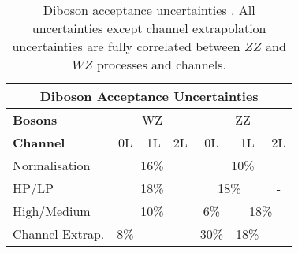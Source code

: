 \begin{table}[!htbp] 
    \footnotesize\centering
    \setlength{\tabcolsep}{0.5em} %
    \begin{tabular}{l|c|c|c|c|c|c}
    \toprule\hline
    \multicolumn{7}{c}{Diboson Acceptance Uncertainties}            
    \\ \hline
    \textbf{Bosons}     & \multicolumn{3}{c|}{{WZ}} & \multicolumn{3}{c}{{ZZ}} 
    \\ \hline
    \textbf{Channel}    &   0L      &   1L    &   2L    &   0L      &   1L      & 2L          
    \\ \hline
    Normalisation       &  \multicolumn{3}{c|}{{16\%}}    &  \multicolumn{3}{c}{{10\%}}
    \\ \hline
    HP/LP               &   \multicolumn{3}{c|}{{18\%}}   &   \multicolumn{2}{c|}{{18\%}}    &   -      
    \\ \hline
    High/Medium    &    \multicolumn{3}{c|}{{10\%}}     &    6\%    &    \multicolumn{2}{c}{{18\%}}
    \\ \hline
    Channel Extrap.     &   8\%    &   \multicolumn{2}{c|}{ - }     &    30\%      &    18\%      &   -
    \\ \hline\bottomrule
    \end{tabular}
    \caption{Diboson acceptance uncertainties \cite{Dao:2688371}. All uncertainties except channel extrapolation uncertainties are fully correlated between $ZZ$ and $WZ$ processes and channels.}
    \label{tab:diboson_acceptance_uncerts}
\end{table}
        